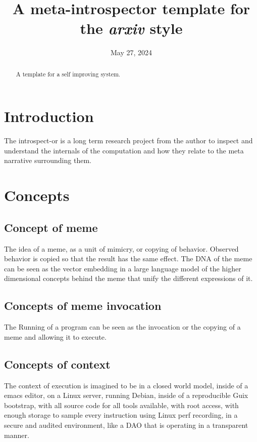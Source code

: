 \documentclass{article}
\title{A meta-introspector template for the \emph{arxiv} style}
\date{May 27, 2024}
\author{ \href{https://github.com/meta-introspector/time/blob/main/authors/james-michael-dupont.org}{\texttt{[image: metaintrospector-icon.png]}\hspace{1mm}Mike DuPont}\thanks
	Author\\
	Meta Introspector\\
	\texttt{jmikedupont2@gmail.com} \\
}
\author[1]{%
  \author{ \href{https://github.com/meta-introspector/time/blob/main/authors/james-michael-dupont.org}{\texttt{[image: metaintrospector-icon.png]}\hspace{1mm}Mike DuPont}\thanks\texttt{jmikedupont2@gmail.com}}}%
\affil[1]{Author, Meta Introspector}
\begin{document}
\maketitle

\begin{abstract}
	A template for a self improving system.
\end{abstract}



\section{Introduction}

The introspect-or is a long term research project from the author to inspect and understand the internals of the computation and how they relate to the meta narrative surrounding them.

\section{Concepts}
\label{sec:concepts}

\subsection{Concept of meme}
The idea of a meme, as a unit of mimicry, or copying of behavior.
Observed behavior is copied so that the result has the same effect.
The DNA of the meme can be seen as the vector embedding in a large language model
of the higher dimensional concepts behind the meme that unify the different expressions of it.

\subsection{Concepts of meme invocation}

The Running of a program can be seen as the invocation or the copying of a meme
and allowing it to execute.

\subsection{Concepts of context}
The context of execution is imagined to be in a closed world model,
inside of a emacs editor, on a Linux server, running Debian,
inside of a reproducible Guix bootstrap,
with all source code for all tools available,
with root access,
with enough storage to sample every instruction using Linux perf recording,
in a secure and audited environment, like a DAO that is operating in a transparent manner.
\end{document}
